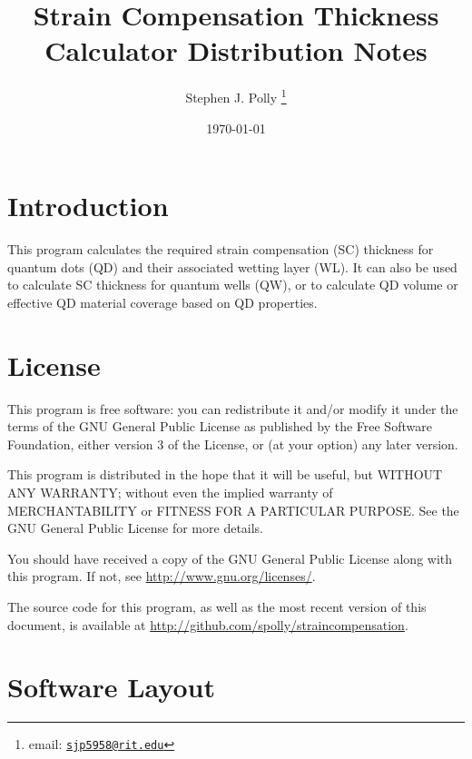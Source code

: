 \documentclass{article}
\begin{document}
\title{Strain Compensation Thickness Calculator Distribution Notes}

\author{Stephen J. Polly 
	\thanks{email: \texttt{\href{mailto:sjp5958@rit.edu}{sjp5958@rit.edu}}}}



\date{\today}

\maketitle

\section{Introduction}
This program calculates the required strain compensation (SC) thickness for quantum dots (QD) and their associated wetting layer (WL). It can also be used to calculate SC thickness for quantum wells (QW), or to calculate QD volume or effective QD material coverage based on QD properties.

\section{License}

This program is free software: you can redistribute it and/or modify it under the terms of the GNU General Public License as published by the Free Software Foundation, either version 3 of the License, or (at your option) any later version.

This program is distributed in the hope that it will be useful, but WITHOUT ANY WARRANTY; without even the implied warranty of MERCHANTABILITY or FITNESS FOR A PARTICULAR PURPOSE.  See the GNU General Public License for more details.

You should have received a copy of the GNU General Public License along with this program.  If not, see \url{http://www.gnu.org/licenses/}.

The source code for this program, as well as the most recent version of this document, is available at \url{http://github.com/spolly/straincompensation}.

\section{Software Layout}
\end{document}
